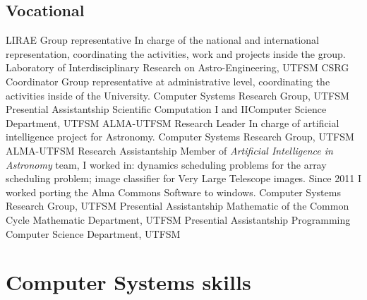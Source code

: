 \documentclass[11pt,a4paper]{moderncv}
\begin{document}
\subsection{Vocational}
	{LIRAE Group representative}
	{In charge of the national and international representation, coordinating the activities, work and projects inside the group.}
	{Laboratory of Interdisciplinary Research on Astro-Engineering, UTFSM}
	{}{}
	{CSRG Coordinator}
    {Group representative at administrative level, coordinating the activities
inside of the University.}
	{Computer Systems Research Group, UTFSM}
	{}{}
	{Presential Assistantship}
	{Scientific Computation I and II}{Computer Science Department, UTFSM}
	{}{}
	{ALMA-UTFSM Research Leader}
	{In charge of artificial intelligence project for Astronomy.}
	{Computer Systems Research Group, UTFSM}
	{}{}
	{ALMA-UTFSM Research Assistantship}
    {Member of \emph{Artificial Intelligence in Astronomy} team, I worked in:
dynamics scheduling problems for the array scheduling problem; image classifier
for Very Large Telescope images. Since 2011 I worked porting the Alma Commons
Software to windows.}
	{Computer Systems Research Group, UTFSM}
	{}{}
	{Presential Assistantship}
	{Mathematic of the Common Cycle}
	{Mathematic Department, UTFSM}
	{}{}
	{Presential Assistantship}
	{Programming}
	{Computer Science Department, UTFSM}
	{}{}

\section{Computer Systems skills}
\end{document}
